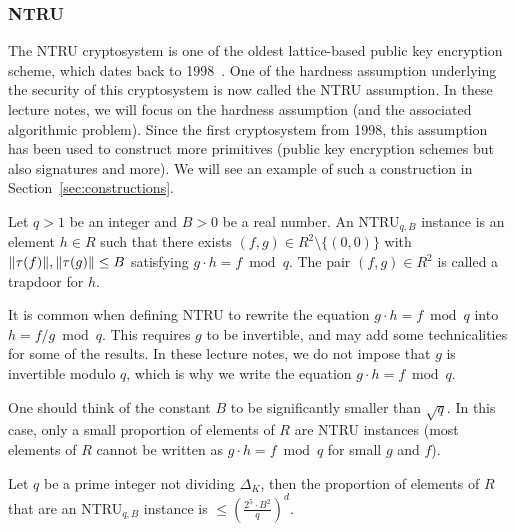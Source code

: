 


\subsubsection{NTRU}
\label{sec:NTRU}
The NTRU cryptosystem is one of the oldest lattice-based public key encryption scheme, which dates back to 1998~\cite{NTRU}. One of the hardness assumption underlying the security of this cryptosystem is now called the NTRU assumption. In these lecture notes, we will focus on the hardness assumption (and the associated algorithmic problem). Since the first cryptosystem from 1998, this assumption has been used to construct more primitives (public key encryption schemes but also signatures and more). We will see an example of such a construction in Section~\ref{sec:constructions}.

\begin{definition}
Let $q >1$ be an integer and $B >0$ be a real number. An NTRU$_{q,B}$ instance is an element $h \in R$ such that there exists $(f,g) \in R^2\setminus \{(0,0)\}$ with $\|\tau(f)\|, \|\tau(g)\| \leq B$ satisfying $g \cdot h = f \bmod q$. The pair $(f,g) \in R^2$ is called a trapdoor for $h$.
\end{definition}

It is common when defining NTRU to rewrite the equation $g \cdot h = f \bmod q$ into $h = f/g \bmod q$. This requires $g$ to be invertible, and may add some technicalities for some of the results. In these lecture notes, we do not impose that $g$ is invertible modulo $q$, which is why we write the equation $g \cdot h = f \bmod q$.

One should think of the constant $B$ to be significantly smaller than $\sqrt{q}$. In this case, only a small proportion of elements of $R$ are NTRU instances (most elements of $R$ cannot be written as $g \cdot h = f \bmod q$ for small $g$ and $f$).

\begin{lemma}
\label{lemma:proportion-NTRU-instances}
Let $q$ be a prime integer not dividing $\Delta_K$, then the proportion of elements of $R$ that are an NTRU$_{q,B}$ instance is $\leq \left( \frac{2^5 \cdot B^2}{q}\right)^d$.
\end{lemma}

